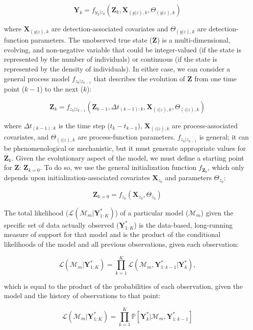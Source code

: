 \documentclass{article}
\begin{document}
\begin{equation}
\textbf{Y}_k = f_{y_k|z_k}(\textbf{Z}_k, \textbf{X}_{(y|z), k}, \Theta_{(y|z), k})
\end{equation}

where $\textbf{X}_{(y|z), k}$ are detection-associated covariates and $\Theta_{(y|z), k}$ are detection-function parameters. The unobserved true state ($\textbf{Z}$) is a multi-dimensional, evolving, and non-negative variable that could be integer-valued (if the state is represented by the number of individuals) or continuous (if the state is represented by the density of individuals). In either case, we can consider a general process model $f_{z_k|z_{k-1}}$ that describes the evolution of $\textbf{Z}$ from one time point ($k-1$) to the next ($k$):

\begin{equation}
\textbf{Z}_{k} = f_{z_k|z_{k-1}}(\textbf{Z}_{k-1}, \Delta t_{(k-1):k}, \textbf{X}_{(z|z), k},\Theta_{(z|z), k})
\end{equation}

where $\Delta t_{(k-1):k}$ is the time step ($t_k - t_{k-1}$), $\textbf{X}_{(z|z), k}$ are process-associated covariates, and $\Theta_{(z|z), k}$ are process-function parameters. $f_{z_k|z_{k-1}}$ is general; it can be phenomenological or mechanistic, but it must generate appropriate values for $\textbf{Z}_{k}$. Given the evolutionary aspect of the model, we must define a starting point for $\textbf{Z}$: $\textbf{Z}_{k=0}$. To do so, we use the general initialization function $f_{\textbf{Z}_0}$, which only depends upon initialization-associated covariates $\textbf{X}_{z_0}$ and parameters $\Theta_{z_0}$:

\begin{equation}
\textbf{Z}_{k=0} = f_{z_0}(\textbf{X}_{z_0}, \Theta_{z_0})
\end{equation}

The total likelihood ($\mathcal{L}(\mathcal{M}_m|\textbf{Y}^{*}_{1:K})$) of a particular model ($\mathcal{M}_m$) given the specific set of data actually observed ($\textbf{Y}^{*}_{1:K}$) is the data-based, long-running measure of support for that model and is the product of the conditional likelihoods of the model and all previous observations, given each observation:

\begin{equation}
\mathcal{L}(\mathcal{M}_m|\textbf{Y}^{*}_{1:K}) = \prod_{k = 1}^{K}{\mathcal{L}(\mathcal{M}_m, \textbf{Y}^{*}_{1:k-1}|\textbf{Y}^{*}_{k})},
\end{equation}

which is equal to the product of the probabilities of each observation, given the model and the history of observations to that point:

\begin{equation}
\mathcal{L}(\mathcal{M}_m|\textbf{Y}^{*}_{1:K}) = \prod_{k = 1}^{K}{\mathbb{P}[\textbf{Y}^{*}_{k}|\mathcal{M}_m, \textbf{Y}^{*}_{1:k-1}]}
\end{equation}


  
\end{document}

